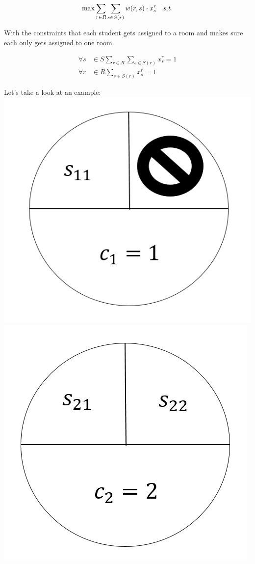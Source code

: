 \documentclass[12pt]{article}
\begin{document}
\begin{equation*}
\max\sum_{r\in{R}}\sum_{s\in{S(r)}}w(r,s)\cdot{x_s^r}\quad{s.t.}\\
\end{equation*}

With the constraints that each student gets assigned to a room and makes sure each only gets assigned to one room.

\begin{align*}
\forall{s}&\in{S}\sum_{r\in{R}}\sum_{s\in{S(r)}}x_s^r=1\\
\forall{r}&\in{R}\sum_{s\in{S(r)}}x_s^r=1
\end{align*}

Let's take a look at an example:\\

\includegraphics[scale=0.25]{c1} %
\includegraphics[scale=0.25]{c2} %
\end{document}
